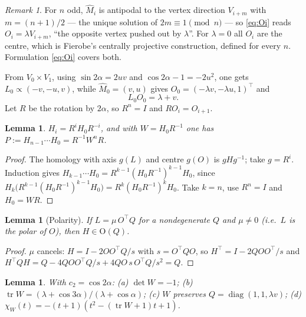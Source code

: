 \documentclass[11pt,a4paper]{article}
\theoremstyle{plain}
\newtheorem{lemma}[theorem]{Lemma}
\theoremstyle{definition}
\theoremstyle{remark}
\newtheorem{remark}[theorem]{Remark}
\newcommand{\tr}{\operatorname{tr}}
\begin{document}
\begin{remark}
For $n$ odd, $\widehat M_i$ is antipodal to the vertex direction $V_{i+m}$ with
$m=(n+1)/2$ --- the unique solution of $2m\equiv1\pmod n$ --- so \eqref{eq:Oi}
reads $O_i=\lambda V_{i+m}$, ``the opposite vertex pushed out by $\lambda$''. For
$\lambda=0$ all $O_i$ are the centre, which is Fierobe's centrally projective
construction, defined for every $n$. Formulation \eqref{eq:Oi} covers both.
\end{remark}

From $V_0\times V_1$, using $\sin2\alpha=2uv$ and $\cos2\alpha-1=-2u^2$, one gets
$L_0\propto(-v,-u,v)$, while $\widehat M_0=(v,u)$ gives
$O_0=(-\lambda v,-\lambda u,1)^\top$ and
\begin{equation}\label{eq:LO}
  L_0O_0=\lambda+v .
\end{equation}
Let $R$ be the rotation by $2\alpha$, so $R^n=I$ and $RO_i=O_{i+1}$.

\begin{lemma}\label{lem:tel}
$H_i=R^iH_0R^{-i}$, and with $W=H_0R^{-1}$ one has
$P:=H_{n-1}\cdots H_0=R^{-1}W^nR$.
\end{lemma}

\begin{proof}
The homology with axis $g(L)$ and centre $g(O)$ is $gHg^{-1}$; take $g=R^i$.
Induction gives $H_{k-1}\cdots H_0=R^{k-1}(H_0R^{-1})^{k-1}H_0$, since
$H_k\bigl(R^{k-1}(H_0R^{-1})^{k-1}H_0\bigr)=R^k(H_0R^{-1})^kH_0$. Take $k=n$, use
$R^n=I$ and $H_0=WR$.
\end{proof}

\begin{lemma}[Polarity]\label{lem:polar}
If $L=\mu\,O^\top Q$ for a nondegenerate $Q$ and $\mu\neq0$ \textup{(}i.e.\ $L$ is
the polar of $O$\textup{)}, then $H\in\mathrm{O}(Q)$.
\end{lemma}

\begin{proof}
$\mu$ cancels: $H=I-2OO^\top Q/s$ with $s=O^\top QO$, so $H^\top=I-2QOO^\top/s$ and
$H^\top QH=Q-4QOO^\top Q/s+4QO\,s\,O^\top Q/s^2=Q$.
\end{proof}

\begin{lemma}\label{lem:ident}
With $c_2=\cos2\alpha$: \textup{(a)} $\det W=-1$; \textup{(b)}
$\tr W=(\lambda+\cos3\alpha)/(\lambda+\cos\alpha)$; \textup{(c)} $W$ preserves
$Q=\operatorname{diag}(1,1,\lambda v)$; \textup{(d)}
$\chi_W(t)=-(t+1)(t^2-(\tr W+1)t+1)$.
\end{lemma}
\end{document}
